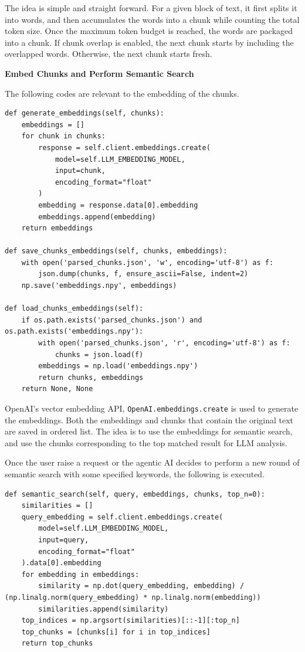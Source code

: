 The idea is simple and straight forward. For a given block of text, it first splits it into words, and then accumulates the words into a chunk while counting the total token size. Once the maximum token budget is reached, the words are packaged into a chunk. If chunk overlap is enabled, the next chunk starts by including the overlapped words. Otherwise, the next chunk starts fresh.

\vspace{0.1in}
\noindent \textbf{Embed Chunks and Perform Semantic Search}
\vspace{0.1in}

The following codes are relevant to the embedding of the chunks.

\begin{lstlisting}
def generate_embeddings(self, chunks):
    embeddings = []
    for chunk in chunks:
        response = self.client.embeddings.create(
            model=self.LLM_EMBEDDING_MODEL,
            input=chunk,
            encoding_format="float"
        )
        embedding = response.data[0].embedding
        embeddings.append(embedding)
    return embeddings

def save_chunks_embeddings(self, chunks, embeddings):
    with open('parsed_chunks.json', 'w', encoding='utf-8') as f:
        json.dump(chunks, f, ensure_ascii=False, indent=2)
    np.save('embeddings.npy', embeddings)

def load_chunks_embeddings(self):
    if os.path.exists('parsed_chunks.json') and os.path.exists('embeddings.npy'):
        with open('parsed_chunks.json', 'r', encoding='utf-8') as f:
            chunks = json.load(f)
        embeddings = np.load('embeddings.npy')
        return chunks, embeddings
    return None, None
\end{lstlisting}

OpenAI's vector embedding API, \verb|OpenAI.embeddings.create| is used to generate the embeddings. Both the embeddings and chunks that contain the original text are saved in ordered list. The idea is to use the embeddings for semantic search, and use the chunks corresponding to the top matched result for LLM analysis. 

Once the user raise a request or the agentic AI decides to perform a new round of semantic search with some specified keywords, the following is executed.

\begin{lstlisting}
def semantic_search(self, query, embeddings, chunks, top_n=0):
    similarities = []
    query_embedding = self.client.embeddings.create(
        model=self.LLM_EMBEDDING_MODEL,
        input=query,
        encoding_format="float"
    ).data[0].embedding
    for embedding in embeddings:
        similarity = np.dot(query_embedding, embedding) / (np.linalg.norm(query_embedding) * np.linalg.norm(embedding))
        similarities.append(similarity)
    top_indices = np.argsort(similarities)[::-1][:top_n]
    top_chunks = [chunks[i] for i in top_indices]
    return top_chunks
\end{lstlisting}

